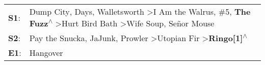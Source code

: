 \begin{supertabular}{p{0.03\textwidth}p{0.92\textwidth}}
 \textbf{S1}:  &  Dump City\textsuperscript{},  Days\textsuperscript{}, \enspace Walletsworth\textsuperscript{} \textgreater \enspace I Am the Walrus\textsuperscript{}, \enspace \#5\textsuperscript{}, \enspace \textbf{The Fuzz\textsuperscript{$\wedge$}} \textgreater \enspace Hurt Bird Bath\textsuperscript{} \textgreater \enspace Wife Soup\textsuperscript{}, \enspace Señor Mouse\textsuperscript{}  \enspace  \\
 \textbf{S2}:  &                                                                                                                                                                            Pay the Snucka\textsuperscript{}, \enspace JaJunk\textsuperscript{}, \enspace Prowler\textsuperscript{} \textgreater \enspace Utopian Fir\textsuperscript{} \textgreater \enspace \textbf{Ringo[1]\textsuperscript{$\wedge$}}  \enspace  \\
 \textbf{E1}:  &                                                                                                                                                                                                                                                                                                                                                                               Hangover\textsuperscript{}  \enspace  \\
\end{supertabular}
